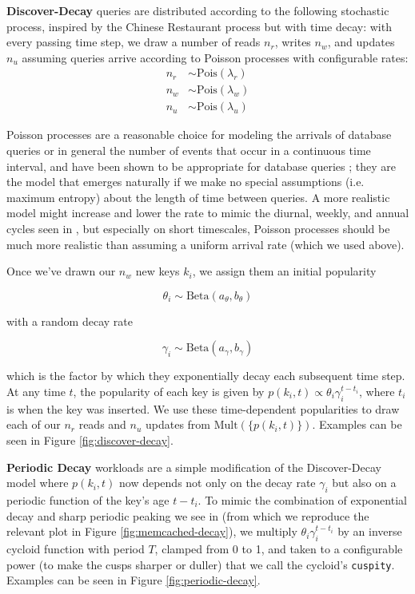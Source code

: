 \documentclass{sig-alternate-05-2015}
\begin{document}
\textbf{Discover-Decay} queries are distributed according to the following
stochastic process, inspired by the Chinese Restaurant process \cite{crp} but
with time decay: with every passing time step, we draw a number of reads $n_r$,
writes $n_w$, and updates $n_u$ assuming queries arrive according to Poisson
processes with configurable rates: \[
\begin{split}
  n_r & \sim \textrm{Pois}(\lambda_r) \\
  n_w & \sim \textrm{Pois}(\lambda_w) \\
  n_u & \sim \textrm{Pois}(\lambda_u)
\end{split}
\]

Poisson processes are a reasonable choice for modeling the arrivals of database
queries or in general the number of events that occur in a continuous time
interval, and have been shown to be appropriate for database queries
\cite{poisson-db1,poisson-db2,poisson-db3}; they are the model that emerges
naturally if we make no special assumptions (i.e. maximum entropy) about the
length of time between queries.  A more realistic model might increase and
lower the rate to mimic the diurnal, weekly, and annual cycles seen in
\cite{characterizing-memcached}, but especially on short timescales, Poisson
processes should be much more realistic than assuming a uniform arrival rate
(which we used above).

Once we've drawn our $n_w$ new keys $k_i$, we assign them an initial popularity

$$
\theta_{i} \sim \textrm{Beta}(a_\theta,b_\theta)
$$

with a random decay rate

$$
\gamma_i \sim \textrm{Beta}(a_\gamma,b_\gamma)
$$

which is the factor by which they exponentially decay each subsequent time
step. At any time $t$, the popularity of each key is given by $p(k_i,t) \propto
\theta_i\gamma_i^{t-t_i}$, where $t_i$ is when the key was inserted. We use
these time-dependent popularities to draw each of our $n_r$ reads and $n_u$
updates from $\textrm{Mult}(\{p(k_i,t)\})$. Examples can be seen in Figure
\ref{fig:discover-decay}.


\textbf{Periodic Decay} workloads are a simple modification of the
Discover-Decay model where $p(k_i,t)$ now depends not only on the decay rate
$\gamma_i$ but also on a periodic function of the key's age $t-t_i$.  To mimic
the combination of exponential decay and sharp periodic peaking we see in
\cite{characterizing-memcached} (from which we reproduce the relevant plot in
Figure \ref{fig:memcached-decay}), we multiply $\theta_i\gamma_i^{t-t_i}$ by an
inverse cycloid function with period $T$, clamped from 0 to 1, and taken to a
configurable power (to make the cusps sharper or duller) that we call the
cycloid's \texttt{cuspity}. Examples can be seen in Figure
\ref{fig:periodic-decay}.
\end{document}
